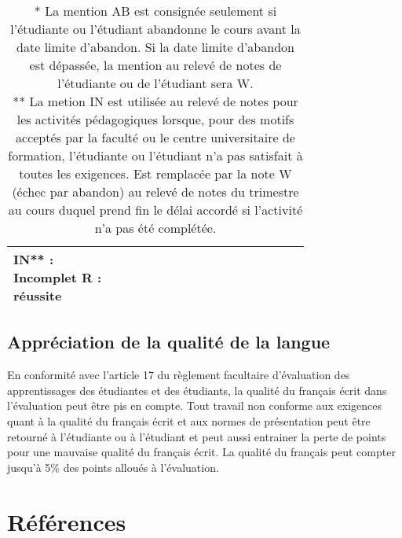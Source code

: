 \documentclass[12]{article}
\begin{document}
\begin{center}
\begin{table}[h]
\begin{tabular}{| p{0.15\linewidth} | p{0.15\linewidth} | p{0.15\linewidth} | p{0.15\linewidth} | p{0.15\linewidth} | }
        \multicolumn{2}{l}{
            IN** : Incomplet\hfill\hfill \linebreak 
            R : réussite\hfill\hfill} \\
		\hline
		\end{tabular}
		\caption*{* La mention AB est consignée seulement si l’étudiante ou l’étudiant abandonne le cours avant la date
		limite d'abandon. Si la date limite d’abandon est dépassée, la mention au relevé de notes de l’étudiante
		ou de l’étudiant sera W.\\
		** La metion IN est utilisée au relevé de notes pour les activités
		pédagogiques lorsque, pour des motifs acceptés par la faculté ou le
		centre universitaire de formation, l’étudiante ou l’étudiant n’a pas
		satisfait à toutes les exigences. Est remplacée par la note W (échec
		par abandon) au relevé de notes du trimestre au cours duquel prend fin
		le délai accordé si l’activité n’a pas été complétée.}
		\end{table}
	\end{center}

    \subsection*{Appréciation de la qualité de la langue}

    En conformité avec l'article 17 du règlement facultaire d'évaluation
    des apprentissages des étudiantes et des étudiants, la qualité du français
    écrit dans l’évaluation peut être pis en compte. Tout travail non conforme
    aux exigences quant à la qualité du français écrit et aux normes de
    présentation  peut être retourné à l'étudiante ou à l'étudiant et peut aussi
    entrainer la perte de points pour une mauvaise qualité du français écrit.
    La qualité du français peut compter jusqu'à 5\% des points alloués à
    l'évaluation.

	
	
    
    

	\section*{Références}
\end{document}
